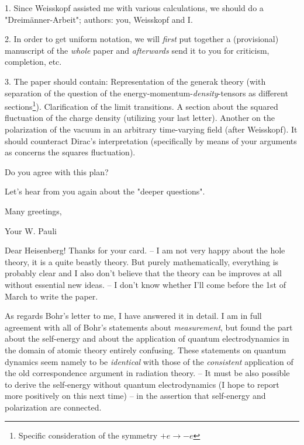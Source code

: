 \documentclass{article}
\begin{document}
1. Since Weisskopf assisted me with various calculations, we should do a "Dreim\"anner-Arbeit"; authors: you, Weisskopf and I.

2. In order to get uniform notation, we will \textit{first} put together a (provisional) manuscript of the \textit{whole} paper and \textit{afterwards} send it to you for criticism, completion, etc.

3. The paper should contain: Representation of the generak theory (with separation of the question of the energy-momentum-\textit{density}-tensors as different sections\footnote{Specific consideration of the symmetry $+e \to -e$}). Clarification of the limit transitions. A section about the squared fluctuation of the charge density (utilizing your last letter). Another on the polarization of the vacuum in an arbitrary time-varying field (after Weisskopf). It should counteract Dirac's interpretation (specifically by means of your arguments as concerns the squares fluctuation).

Do you agree with this plan?

Let's hear from you again about the "deeper questions".

Many greetings,

Your W. Pauli


\date{February 23, 1934}

Dear Heisenberg! Thanks for your card. -- I am not very happy about the hole theory, it is a quite beastly theory. But purely mathematically, everything is probably clear and I also don't believe that the theory can be improves at all without essential new ideas. -- I don't know whether I'll come before the 1st of March to write the paper.

As regards Bohr's letter to me, I have answered it in detail. I am in full agreement with all of Bohr's statements about \textit{measurement}, but found the part about the self-energy and about the application of quantum electrodynamics in the domain of  atomic theory entirely confusing. These statements on quantum dynamics seem namely to be \textit{identical} with those of the \textit{consistent} application of the old correspondence argument in radiation theory. -- It must be also possible to derive the self-energy without quantum electrodynamics (I hope to report more positively on this next time) --  in the assertion that self-energy and polarization are connected.
\end{document}
